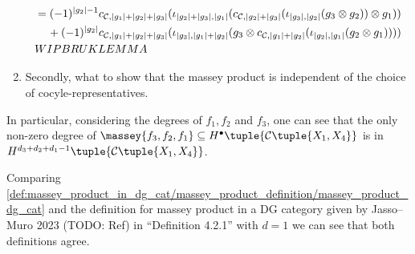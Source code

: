 \begin{remark}
\begin{enumerate}
{\begin{align*}
                &= (-1)^{|g_2| - 1}c_{{\mathcal{C}}, |g_1| + |g_2| + |g_3|}(\iota_{|g_2| + |g_3|, |g_1|}(c_{{\mathcal{C}}, |g_2| + |g_3|}(\iota_{|g_3|, |g_2|}(g_3 \otimes g_2)) \otimes g_1)) \\
                &\hspace{0.4cm} + (-1)^{|g_2|}c_{{\mathcal{C}}, |g_1| + |g_2| + |g_3|}(\iota_{|g_3|, |g_1| + |g_2|}(g_3 \otimes c_{{\mathcal{C}}, |g_1| + |g_2|}(\iota_{|g_2|, |g_1|}(g_2 \otimes g_1)))) \\
                &WIP BRUK LEMMA
            \end{align*}
        }
        \item {
            Secondly, what to show that the massey product is independent of the choice of cocyle-representatives.
        }
    \end{enumerate}
\end{remark}

\begin{remark}
    \label{rem:massey_product_in_dg_cat/massey_product_definition/massey_product_sum_of_degrees}
    In particular, considering the degrees of \( f_1, f_2 \) and \( f_3 \), one can see that the only non-zero degree of \( \massey{f_3, f_2, f_1 } \subseteq H^\bullet \tuple{\Cc \tuple{X_1, X_4}} \) is in \( H^{d_3 + d_2 + d_1 - 1} \tuple{\Cc \tuple{X_1, X_4}} \).
\end{remark}

\begin{remark}
    Comparing \autoref{def:massey_product_in_dg_cat/massey_product_definition/massey_product_dg_cat} and the definition for massey product in a DG category given by Jasso--Muro 2023 (TODO: Ref) in ``Definition 4.2.1'' with \( d = 1 \) we can see that both definitions agree.
\end{remark}

